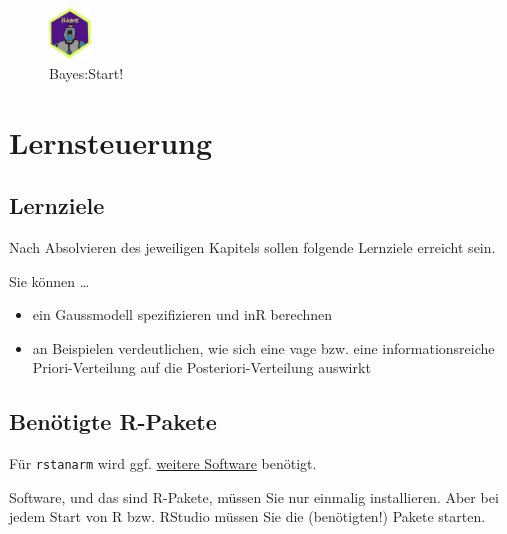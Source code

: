 \documentclass[
  a4paper,
  DIV=11]{scrreprt}
\providecommand{\tightlist}{%
  \setlength{\itemsep}{0pt}\setlength{\parskip}{0pt}}\usepackage{longtable,booktabs,array}
\theoremstyle{definition}
\theoremstyle{remark}
\begin{document}
\begin{figure}

{\centering \includegraphics[width=0.1\textwidth,height=\textheight]{./img/Golem_hex.png}

}

\caption{Bayes:Start!}

\end{figure}

\hypertarget{lernsteuerung-6}{%
\section{Lernsteuerung}\label{lernsteuerung-6}}

\hypertarget{lernziele-7}{%
\subsection{Lernziele}\label{lernziele-7}}

Nach Absolvieren des jeweiligen Kapitels sollen folgende Lernziele
erreicht sein.

Sie können \ldots{}

\begin{itemize}
\tightlist
\item
  ein Gaussmodell spezifizieren und inR berechnen
\item
  an Beispielen verdeutlichen, wie sich eine vage bzw. eine
  informationsreiche Priori-Verteilung auf die Posteriori-Verteilung
  auswirkt
\end{itemize}

\hypertarget{benuxf6tigte-r-pakete-4}{%
\subsection{Benötigte R-Pakete}\label{benuxf6tigte-r-pakete-4}}

Für \texttt{rstanarm} wird ggf.
\href{https://github.com/stan-dev/rstan/wiki/RStan-Getting-Started}{weitere
Software} benötigt.

\begin{tcolorbox}[enhanced jigsaw, leftrule=.75mm, left=2mm, bottomrule=.15mm, opacityback=0, coltitle=black, colbacktitle=quarto-callout-note-color!10!white, opacitybacktitle=0.6, rightrule=.15mm, toptitle=1mm, colback=white, colframe=quarto-callout-note-color-frame, arc=.35mm, toprule=.15mm, breakable, titlerule=0mm, bottomtitle=1mm, title=\textcolor{quarto-callout-note-color}{\faInfo}\hspace{0.5em}{Hinweis}]
Software, und das sind R-Pakete, müssen Sie nur einmalig installieren.
Aber bei jedem Start von R bzw. RStudio müssen Sie die (benötigten!)
Pakete starten.
\end{tcolorbox}
\end{document}
